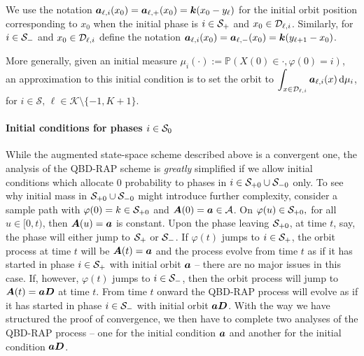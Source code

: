 We use the notation \(\boldsymbol a_{\ell,i}(x_0) = \boldsymbol a_{\ell,+}(x_0) = \boldsymbol k(x_0-y_\ell)\) for the initial orbit position corresponding to \(x_0\) when the initial phase is \(i\in\mathcal{S}_+\) and \(x_0\in\mathcal{D}_{\ell,i}\). Similarly, for \(i\in\mathcal{S}_-\) and \(x_0\in\mathcal{D}_{\ell,i}\) define the notation \(\boldsymbol a_{\ell,i}(x_0) = \boldsymbol a_{\ell,-}(x_0) = \boldsymbol k(y_{\ell+1}-x_0)\). 

More generally, given an initial measure \(\mu_i(\cdot):= \mathbb P(X(0)\in\cdot,\varphi(0)=i)\), an approximation to this initial condition is to set the orbit to \(\displaystyle\int_{x\in\mathcal{D}_{\ell,i}}\boldsymbol a_{\ell,i} (x) \, \mathrm{d} \mu_i\), for \(i\in\mathcal S,\, \ell\in\mathcal K\setminus\{-1,K+1\}\). 

\paragraph{Initial conditions for phases \(i\in\mathcal{S}_0\)}
While the augmented state-space scheme described above is a convergent one, the analysis of the QBD-RAP scheme is \emph{greatly} simplified if we allow initial conditions which allocate \(0\) probability to phases in \(i\in\mathcal{S}_{+0}\cup\mathcal{S}_{-0}\) only. To see why initial mass in \(\mathcal S_{+0}\cup\mathcal{S}_{-0}\) might introduce further complexity, consider a sample path with \(\varphi(0)=k\in\mathcal{S}_{+0}\) and \(\boldsymbol A(0)=\boldsymbol a\in\mathcal A\). On \(\varphi(u)\in\mathcal{S}_{+0},\) for all \(u\in[0,t)\), then \(\boldsymbol A(u) = \boldsymbol a \) is constant. Upon the phase leaving \(\mathcal{S}_{+0}\), at time \(t\), say, the phase will either jump to \(\mathcal{S}_+\) or \(\mathcal{S}_-\). If \(\varphi(t)\) jumps to \(i\in\mathcal{S}_+\), the orbit process at time \(t\) will be \(\boldsymbol A(t)=\boldsymbol a \) and the process evolve from time \(t\) as if it has started in phase \(i\in\mathcal{S}_+\) with initial orbit \(\boldsymbol a \) -- there are no major issues in this case. If, however, \(\varphi(t)\) jumps to \(i\in\mathcal{S}_-\), then the orbit process will jump to \(\boldsymbol A(t) = \boldsymbol a \boldsymbol D\) at time \(t\). From time \(t\) onward the QBD-RAP process will evolve as if it has started in phase \(i\in\mathcal{S}_-\) with initial orbit \(\boldsymbol a \boldsymbol D\). With the way we have structured the proof of convergence, we then have to complete two analyses of the QBD-RAP process -- one for the initial condition \(\boldsymbol a\) and another for the initial condition \(\boldsymbol a\boldsymbol D\). 

